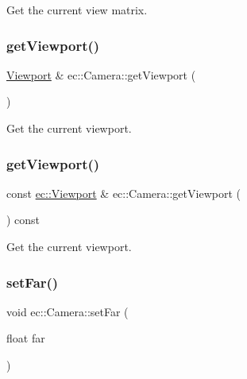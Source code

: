 Get the current view matrix. 

\mbox{\label{classec_1_1_camera_a1f2f4a745112c095d17480959a70eb16}} 
\subsubsection{\texorpdfstring{get\+Viewport()}{getViewport()}\hspace{0.1cm}{\footnotesize\ttfamily [1/2]}}
{\footnotesize\ttfamily \mbox{\hyperlink{classec_1_1_viewport}{Viewport}} \& ec\+::\+Camera\+::get\+Viewport (\begin{DoxyParamCaption}{ }\end{DoxyParamCaption})}



Get the current viewport. 

\mbox{\label{classec_1_1_camera_adb2920a7a634aadcaca579eaf3fc1ad0}} 
\subsubsection{\texorpdfstring{get\+Viewport()}{getViewport()}\hspace{0.1cm}{\footnotesize\ttfamily [2/2]}}
{\footnotesize\ttfamily const \mbox{\hyperlink{classec_1_1_viewport}{ec\+::\+Viewport}} \& ec\+::\+Camera\+::get\+Viewport (\begin{DoxyParamCaption}{ }\end{DoxyParamCaption}) const}



Get the current viewport. 

\mbox{\label{classec_1_1_camera_abdc800333490ec4f890559951340bd08}} 
\subsubsection{\texorpdfstring{set\+Far()}{setFar()}}
{\footnotesize\ttfamily void ec\+::\+Camera\+::set\+Far (\begin{DoxyParamCaption}\item[{float}]{far }\end{DoxyParamCaption})}



